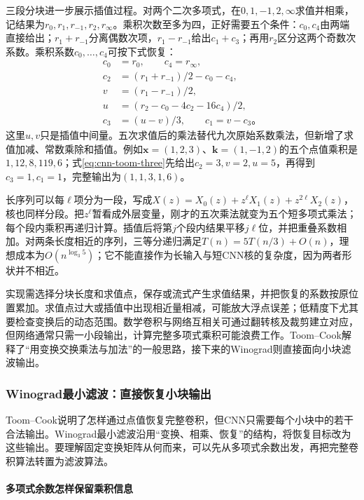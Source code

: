 三段分块进一步展示插值过程。对两个二次多项式，在$0,1,-1,2,\infty$求值并相乘，记结果为$r_0,r_1,r_{-1},r_2,r_\infty$。乘积次数至多为四，正好需要五个条件：$c_0,c_4$由两端直接给出；$r_1+r_{-1}$分离偶数次项，$r_1-r_{-1}$给出$c_1+c_3$；再用$r_2$区分这两个奇数次系数。乘积系数$c_0,\ldots,c_4$可按下式恢复：
\begin{equation}
  \begin{aligned}
    c_0&=r_0,\qquad c_4=r_\infty,\\
    c_2&=(r_1+r_{-1})/2-c_0-c_4,\\
    v&=(r_1-r_{-1})/2,\\
    u&=(r_2-c_0-4c_2-16c_4)/2,\\
    c_3&=(u-v)/3,\qquad c_1=v-c_3\text{。}
  \end{aligned}
  \label{eq:cnn-toom-three}
\end{equation}
这里$u,v$只是插值中间量。五次求值后的乘法替代九次原始系数乘法，但新增了求值加减、常数乘除和插值。例如$\bm x=(1,2,3)$、$\bm k=(1,-1,2)$的五个点值乘积是$1,12,8,119,6$；式\eqref{eq:cnn-toom-three}先给出$c_2=3,v=2,u=5$，再得到$c_3=1,c_1=1$，完整输出为$(1,1,3,1,6)$。

长序列可以每$\ell$项分为一段，写成$X(z)=X_0(z)+z^\ell X_1(z)+z^{2\ell}X_2(z)$，核也同样分段。把$z^\ell$暂看成外层变量，刚才的五次乘法就变为五个短多项式乘法；每个段内乘积再递归计算。插值后将第$j$个段内结果平移$j\ell$位，并把重叠系数相加。对两条长度相近的序列，三等分递归满足$T(n)=5T(n/3)+O(n)$，理想成本为$O(n^{\log_3 5})$；它不能直接作为长输入与短CNN核的复杂度，因为两者形状并不相近。

实现需选择分块长度和求值点，保存或流式产生求值结果，并把恢复的系数按原位置累加。求值点过大或插值中出现相近量相减，可能放大浮点误差；低精度下尤其要检查变换后的动态范围。数学卷积与网络互相关可通过翻转核及裁剪建立对应，但网络通常只需一小段输出，计算完整多项式乘积可能浪费工作。Toom--Cook解释了“用变换交换乘法与加法”的一般思路，接下来的Winograd则直接面向小块滤波输出。

\subsubsection{Winograd最小滤波：直接恢复小块输出}
\label{sec:cnn-winograd}

Toom--Cook说明了怎样通过点值恢复完整卷积，但CNN只需要每个小块中的若干合法输出。Winograd最小滤波沿用“变换、相乘、恢复”的结构，将恢复目标改为这些输出。要理解固定变换矩阵从何而来，可以先从多项式余数出发，再把完整卷积算法转置为滤波算法。

\paragraph{多项式余数怎样保留乘积信息}


